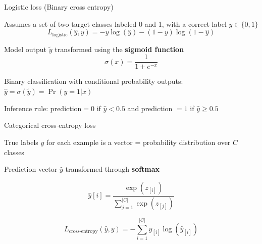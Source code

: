 \documentclass[12pt]{beamer}
\begin{document}
\begin{frame}{Logistic loss (Binary cross entropy)}

Assumes a set of two target classes labeled 0 and 1, with a correct label $y\in \{0, 1\}$
\begin{equation*}
L_{\text{logistic}} (\hat{y}, y) = -y \log(\hat{y}) -(1-y) \log(1-\hat{y})
\end{equation*}

Model output $\tilde{y}$ transformed using the \textbf{sigmoid function}
			\begin{equation*}
				\sigma(x) = \frac{1}{1+e^{-x}}
			\end{equation*}

Binary classification with conditional probability outputs:
$\hat{y} = \sigma(\tilde{y}) = \Pr(y=1|x)$

Inference rule: prediction$=0$ if $\hat{y}<0.5$ and prediction $=1$ if $\hat{y} \geq 0.5$

\end{frame}


\begin{frame}{Categorical cross-entropy loss}

True labels $y$ for each example is a vector = probability distribution over $C$ classes

Prediction vector $\hat{y}$ transformed through \textbf{softmax}

$$
\hat{y}[i] = \frac{\exp(z_{[i]})}{\sum_{j = 1}^{|C|} \exp(z_{[j]})}
$$

$$
L_{\text{cross-entropy}} (\hat{y}, y) = - \sum_{i = 1}^{|C|} y_{[i]} \log(\hat{y}_{[i]})
$$

\end{frame}
\end{document}

